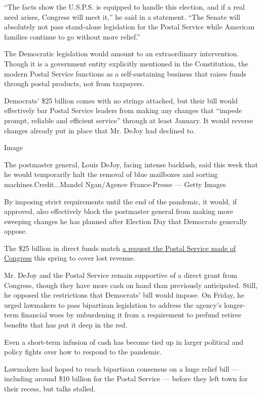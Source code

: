 ``The facts show the U.S.P.S. is equipped to handle this election, and
if a real need arises, Congress will meet it,'' he said in a statement.
``The Senate will absolutely not pass stand-alone legislation for the
Postal Service while American families continue to go without more
relief.''

The Democratic legislation would amount to an extraordinary
intervention. Though it is a government entity explicitly mentioned in
the Constitution, the modern Postal Service functions as a
self-sustaining business that raises funds through postal products, not
from taxpayers.

Democrats' \$25 billion comes with no strings attached, but their bill
would effectively bar Postal Service leaders from making any changes
that ``impede prompt, reliable and efficient service'' through at least
January. It would reverse changes already put in place that Mr. DeJoy
had declined to.

Image

The postmaster general, Louis DeJoy, facing intense backlash, said this
week that he would temporarily halt the removal of blue mailboxes and
sorting machines.Credit...Mandel Ngan/Agence France-Presse --- Getty
Images

By imposing strict requirements until the end of the pandemic, it would,
if approved, also effectively block the postmaster general from making
more sweeping changes he has planned after Election Day that Democrats
generally oppose.

The \$25 billion in direct funds match
\href{https://www.nytimes3xbfgragh.onion/2020/04/09/us/politics/coronavirus-is-threatening-one-of-governments-steadiest-services-the-mail.html?action=click\&module=RelatedLinks\&pgtype=Article}{a
request the Postal Service made of Congress} this spring to cover lost
revenue.

Mr. DeJoy and the Postal Service remain supportive of a direct grant
from Congress, though they have more cash on hand than previously
anticipated. Still, he opposed the restrictions that Democrats' bill
would impose. On Friday, he urged lawmakers to pass bipartisan
legislation to address the agency's longer-term financial woes by
unburdening it from a requirement to prefund retiree benefits that has
put it deep in the red.

Even a short-term infusion of cash has become tied up in larger
political and policy fights over how to respond to the pandemic.

Lawmakers had hoped to reach bipartisan consensus on a huge relief bill
--- including around \$10 billion for the Postal Service --- before they
left town for their recess, but talks stalled.

